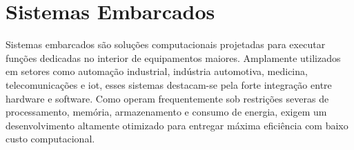 \section{Sistemas Embarcados}

Sistemas embarcados são soluções computacionais projetadas para executar funções dedicadas no interior de equipamentos maiores. Amplamente utilizados em setores como automação industrial,
indústria automotiva, medicina, telecomunicações e \gls{iot}, esses sistemas destacam-se pela forte integração entre hardware e software. Como operam frequentemente sob restrições severas de
processamento, memória, armazenamento e consumo de energia, exigem um desenvolvimento altamente otimizado para entregar máxima eficiência com baixo custo computacional.
